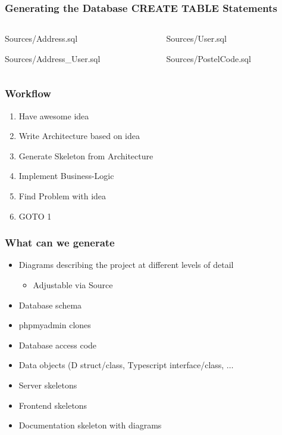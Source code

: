 \documentclass[xelatex,10pt]{beamer}
\begin{document}
\begin{frame}
	\frametitle{Generating the Database CREATE TABLE Statements}
\begin{columns}[T]
\begin{column}{0.49\linewidth}
	
	{Sources/Address.sql}
	
	{Sources/Address_User.sql}
\end{column}
\begin{column}{0.49\linewidth}
	
	{Sources/User.sql}
	
	{Sources/PostelCode.sql}
\end{column}
		
\end{columns}
\end{frame}

\begin{frame}
	\frametitle{Workflow}
	\begin{enumerate}
		\item Have awesome idea
		\item Write Architecture based on idea
		\item Generate Skeleton from Architecture
		\item Implement Business-Logic
		\item Find Problem with idea
		\item GOTO 1
		
	\end{enumerate}
	
\end{frame}

\begin{frame}
	\frametitle{What can we generate}
	\begin{itemize}
		\item Diagrams describing the project at different levels of detail
		\begin{itemize}
			\item Adjustable via Source
		\end{itemize}
		\item Database schema
		\item phpmyadmin clones
		\item Database access code
		\item Data objects (D struct/class, Typescript interface/class, \(\dots\)
		\item Server skeletons
		\item Frontend skeletons
		\item Documentation skeleton with diagrams
	\end{itemize}
\end{frame}
\end{document}
